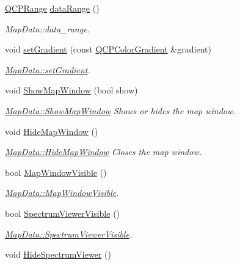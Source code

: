 \begin{DoxyCompactItemize}
\item 
\hyperlink{class_q_c_p_range}{Q\+C\+P\+Range} \hyperlink{class_map_data_aab56283cdcdbc2d122a6a4a6d0da0eb7}{data\+Range} ()
\begin{DoxyCompactList}\small\item\em Map\+Data\+::data\+\_\+range. \end{DoxyCompactList}\item 
void \hyperlink{class_map_data_ad9e7fbe1bbb0f16b52eb71e0c7da4fb6}{set\+Gradient} (const \hyperlink{class_q_c_p_color_gradient}{Q\+C\+P\+Color\+Gradient} \&gradient)
\begin{DoxyCompactList}\small\item\em \hyperlink{class_map_data_ad9e7fbe1bbb0f16b52eb71e0c7da4fb6}{Map\+Data\+::set\+Gradient}. \end{DoxyCompactList}\item 
void \hyperlink{class_map_data_a7f07e3927312473322090e46b1015205}{Show\+Map\+Window} (bool show)\hypertarget{class_map_data_a7f07e3927312473322090e46b1015205}{}\label{class_map_data_a7f07e3927312473322090e46b1015205}

\begin{DoxyCompactList}\small\item\em \hyperlink{class_map_data_a7f07e3927312473322090e46b1015205}{Map\+Data\+::\+Show\+Map\+Window} Shows or hides the map window. \end{DoxyCompactList}\item 
void \hyperlink{class_map_data_a3a4fab7a7f8862cab5f3fb9df19d41b5}{Hide\+Map\+Window} ()\hypertarget{class_map_data_a3a4fab7a7f8862cab5f3fb9df19d41b5}{}\label{class_map_data_a3a4fab7a7f8862cab5f3fb9df19d41b5}

\begin{DoxyCompactList}\small\item\em \hyperlink{class_map_data_a3a4fab7a7f8862cab5f3fb9df19d41b5}{Map\+Data\+::\+Hide\+Map\+Window} Closes the map window. \end{DoxyCompactList}\item 
bool \hyperlink{class_map_data_aef9546998544f313097d1510b1d2316f}{Map\+Window\+Visible} ()
\begin{DoxyCompactList}\small\item\em \hyperlink{class_map_data_aef9546998544f313097d1510b1d2316f}{Map\+Data\+::\+Map\+Window\+Visible}. \end{DoxyCompactList}\item 
bool \hyperlink{class_map_data_ac0606ccd229f86320f5f08838d4d96db}{Spectrum\+Viewer\+Visible} ()
\begin{DoxyCompactList}\small\item\em \hyperlink{class_map_data_ac0606ccd229f86320f5f08838d4d96db}{Map\+Data\+::\+Spectrum\+Viewer\+Visible}. \end{DoxyCompactList}\item 
void \hyperlink{class_map_data_a61f4104e14f8b8e0d1a51872412737e1}{Hide\+Spectrum\+Viewer} ()\hypertarget{class_map_data_a61f4104e14f8b8e0d1a51872412737e1}{}\label{class_map_data_a61f4104e14f8b8e0d1a51872412737e1}


\end{DoxyCompactItemize}
